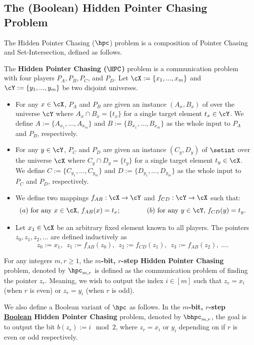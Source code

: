 \subsection{The (Boolean) Hidden Pointer Chasing Problem}

The Hidden Pointer Chasing ($\hpc$) problem is a composition of Pointer Chasing and Set-Intersection, defined as follows.

\begin{definition}\label{prob:hpc}
The \textbf{Hidden Pointer Chasing ($\HPC$)} problem is a communication problem
with four players $P_A, P_B, P_C$, and $P_D$. 
Let $\cX := \{x_1,...,x_m\}$ and $\cY := \{y_1,...,y_m\}$ be two disjoint universes. 
    \begin{itemize}
        \item For any $x\in \cX$, $P_A$ and $P_B$ are given an instance $(A_x,B_x)$ of \setint over the universe $\cY$ where $A_x \cap B_x = \{t_x\}$ for a single target element $t_x \in \cY$. We define $A := \{A_{x_1} ,\ldots, A_{x_m} \}$ and $B:=\{B_{x_1} ,\ldots, B_{x_m} \}$ as the whole input to $P_A$ and $P_B$, respectively.
        
        \item For any $y\in \cY$, $P_C$ and $P_D$ are given an instance $(C_y,D_y)$ of $\setint$ over the universe $\cX$ where $C_y \cap D_y = \{t_y\}$ for a single target element $t_y \in \cX$. We define $C := \{C_{y_1} ,\ldots, C_{y_m} \}$ and $D:=\{D_{y_1} ,\ldots,D_{y_m} \}$ as the whole input to $P_C$ and $P_D$, respectively.
        
        \item We define two mappings $f_{AB} : \cX \to \cY$ and $f_{CD} : \cY \to \cX$ such that:
        \[
            (a) ~ \textnormal{for any $x\in \cX$, $f_{AB}(x) = t_x$;} \qquad \qquad (b) ~ \textnormal{for any $y\in \cY$, $f_{CD}(y) = t_y$}.
         \]
        \item Let $x_1 \in \cX$ be an arbitrary fixed element known to all players. The pointers $z_0,z_1,z_2,\ldots$ are defined inductively as 
        $$z_0 := x_1, ~~z_1 := f_{AB}(z_0),~~ z_2 := f_{CD}(z_1), ~~z_3 := f_{AB}(z_2),~\ldots.$$
    \end{itemize}
For any integers $m,r \geq 1$, the \textnormal{\textbf{$m$-bit, $r$-step Hidden Pointer Chasing}} problem, denoted by $\hpc_{m,r}$ is defined as the communication problem of finding the pointer $z_r$. Meaning, we wish to output the index $i \in [m]$ such that $z_r = x_i$ (when $r$ is even) or $z_r = y_i$ (when $r$ is odd). 

We also define a Boolean variant of $\hpc$ as follows. In the \textnormal{\textbf{$m$-bit, $r$-step \underline{Boolean} Hidden Pointer Chasing}} problem, denoted by $\bhpc_{m,r}$, the goal is to output the bit $b(z_r):=i \mod 2$, where $z_r = x_i$ or $y_i$ depending on if $r$ is even or odd respectively. 
\end{definition}

